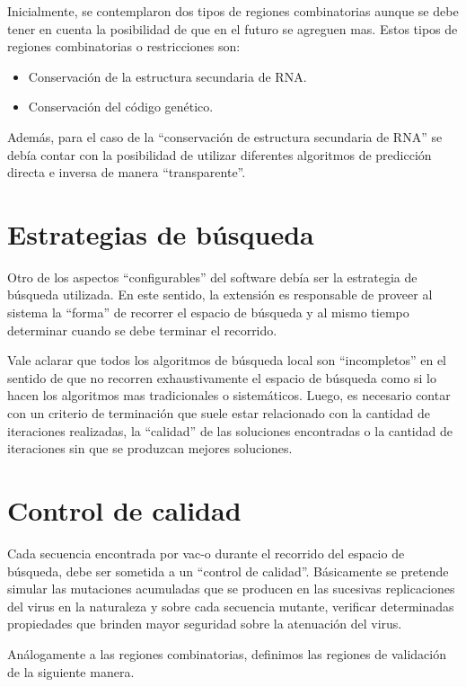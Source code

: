 Inicialmente, se contemplaron dos tipos de regiones combinatorias aunque se debe
tener en cuenta la posibilidad de que en el futuro se agreguen mas. Estos tipos
de regiones combinatorias o restricciones son:
\begin{itemize}
 \item Conservaci\'on de la estructura secundaria de \ac{RNA}.
 \item Conservaci\'on del c\'odigo gen\'etico.
\end{itemize}

Adem\'as, para el caso de la ``conservaci\'on de estructura secundaria de
\ac{RNA}'' se deb\'ia contar con la posibilidad de utilizar diferentes
algoritmos de predicci\'on directa e inversa de manera ``transparente''.

\section{Estrategias de b\'usqueda}

Otro de los aspectos ``configurables'' del software deb\'ia ser la estrategia
de b\'usqueda utilizada. En este sentido, la extensi\'on es responsable de
proveer al sistema la ``forma'' de recorrer el espacio de b\'usqueda y al mismo
tiempo determinar cuando se debe terminar el recorrido.

Vale aclarar que todos los algoritmos de b\'usqueda local son ``incompletos''
en el sentido de que no recorren exhaustivamente el espacio de b\'usqueda como
si lo hacen los algoritmos mas tradicionales o sistem\'aticos. Luego, es
necesario contar con un criterio de terminaci\'on que suele estar relacionado
con la cantidad de iteraciones realizadas, la ``calidad'' de las soluciones
encontradas o la cantidad de iteraciones sin que se produzcan mejores
soluciones.

\section{Control de calidad}

Cada secuencia encontrada por \ac{vac-o} durante el recorrido del espacio
de b\'usqueda, debe ser sometida a un ``control de calidad''. B\'asicamente
se pretende simular las mutaciones acumuladas que se producen en las sucesivas
replicaciones del virus en la naturaleza y sobre cada secuencia mutante,
verificar determinadas propiedades que brinden mayor seguridad sobre la
atenuaci\'on del virus.

An\'alogamente a las regiones combinatorias, definimos las regiones de
validaci\'on de la siguiente manera.

